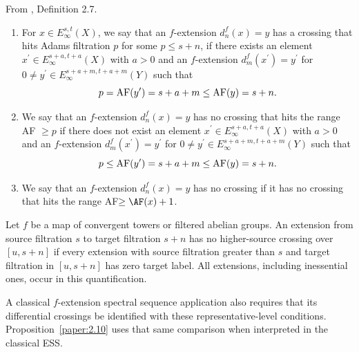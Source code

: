 \begin{definition}
\label{paper:2.7}
From \cite{LWX126}, Definition 2.7.\par

\label{def:98skj23}
\begin{enumerate}[leftmargin=*]
    \item For $x\in E_\infty^{s,t}(X)$, we say that an $f$-extension $d_n^{f}(x)=y$ has a crossing that hits Adams filtration $p$ for some $p \leq s+n$, if there exists an element $x^\prime\in E_\infty^{s+a,t+a}(X)$ with $a>0$ and an $f$-extension $d_m^{f}(x^\prime)=y^\prime$ for $0\neq y^\prime\in E^{s+a+m, t+a+m}_\infty(Y)$ such that
    $$p = \textup{AF}(y^\prime) = s+a+m\le \textup{AF}(y) = s+n.$$
    \item We say that an $f$-extension $d_n^{f}(x)=y$ has no crossing that hits the range AF $\ge p$ if there does not exist an element $x^\prime\in E_\infty^{s+a,t+a}(X)$ with $a>0$ and an $f$-extension $d_m^{f}(x^\prime)=y^\prime$ for $0\neq y^\prime\in E^{s+a+m, t+a+m}_\infty(Y)$ such that
    $$p\le \textup{AF}(y^\prime) = s+a+m\le \textup{AF}(y) = s+n.$$
    \item We say that an $f$-extension $d_n^{f}(x)=y$ has no crossing if it has no crossing that hits the range AF$\ge \AF(x) + 1$.
\end{enumerate}


Let $f$ be a map of convergent towers or filtered abelian groups. An extension from source filtration $s$ to target filtration $s+n$ has no higher-source crossing over $[u,s+n]$ if every extension with source filtration greater than $s$ and target filtration in $[u,s+n]$ has zero target label. All extensions, including inessential ones, occur in this quantification.


A classical $f$-extension spectral sequence application also requires
that its differential crossings be identified with these
representative-level conditions. Proposition~\ref{paper:2.10} uses
that same comparison when interpreted in the classical ESS.


\sketch
\end{definition}

